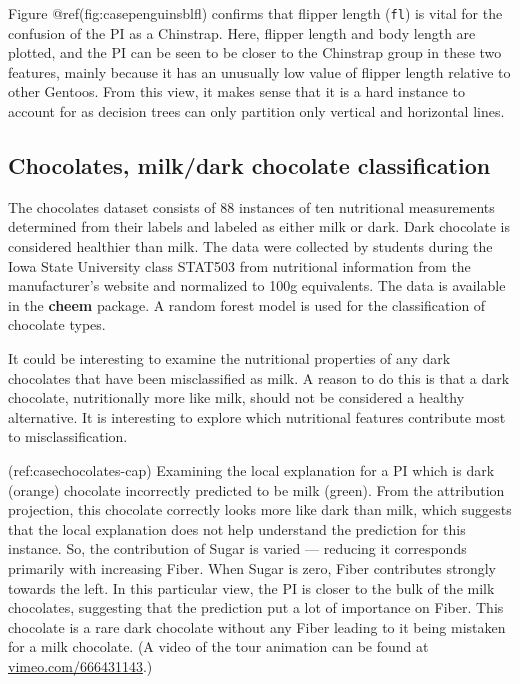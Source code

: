 \documentclass[
]{article}
\begin{document}
Figure @ref(fig:casepenguinsblfl) confirms that flipper length
(\texttt{fl}) is vital for the confusion of the PI as a Chinstrap. Here,
flipper length and body length are plotted, and the PI can be seen to be
closer to the Chinstrap group in these two features, mainly because it
has an unusually low value of flipper length relative to other Gentoos.
From this view, it makes sense that it is a hard instance to account for
as decision trees can only partition only vertical and horizontal lines.

\hypertarget{chocolates-milkdark-chocolate-classification}{%
\subsection{Chocolates, milk/dark chocolate
classification}\label{chocolates-milkdark-chocolate-classification}}

The chocolates dataset consists of 88 instances of ten nutritional
measurements determined from their labels and labeled as either milk or
dark. Dark chocolate is considered healthier than milk. The data were
collected by students during the Iowa State University class STAT503
from nutritional information from the manufacturer's website and
normalized to 100g equivalents. The data is available in the
\textbf{cheem} package. A random forest model is used for the
classification of chocolate types.

It could be interesting to examine the nutritional properties of any
dark chocolates that have been misclassified as milk. A reason to do
this is that a dark chocolate, nutritionally more like milk, should not
be considered a healthy alternative. It is interesting to explore which
nutritional features contribute most to misclassification.

(ref:casechocolates-cap) Examining the local explanation for a PI which
is dark (orange) chocolate incorrectly predicted to be milk (green).
From the attribution projection, this chocolate correctly looks more
like dark than milk, which suggests that the local explanation does not
help understand the prediction for this instance. So, the contribution
of Sugar is varied --- reducing it corresponds primarily with increasing
Fiber. When Sugar is zero, Fiber contributes strongly towards the left.
In this particular view, the PI is closer to the bulk of the milk
chocolates, suggesting that the prediction put a lot of importance on
Fiber. This chocolate is a rare dark chocolate without any Fiber leading
to it being mistaken for a milk chocolate. (A video of the tour
animation can be found at
\href{https://vimeo.com/666431143}{vimeo.com/666431143}.)
\end{document}
